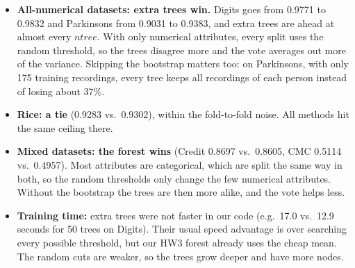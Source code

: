 \documentclass{article}
\begin{document}
\begin{itemize}
\item \textbf{All-numerical datasets: extra trees win.} Digits goes from 0.9771 to 0.9832 and Parkinsons from 0.9031
to 0.9383, and extra trees are ahead at almost every $ntree$. With only numerical attributes, every split uses the
random threshold, so the trees disagree more and the vote averages out more of the variance. Skipping the bootstrap
matters too: on Parkinsons, with only 175 training recordings, every tree keeps all recordings of each person instead
of losing about 37\%.
\item \textbf{Rice: a tie} (0.9283 vs.\ 0.9302), within the fold-to-fold noise. All methods hit the same ceiling there.
\item \textbf{Mixed datasets: the forest wins} (Credit 0.8697 vs.\ 0.8605, CMC 0.5114 vs.\ 0.4957). Most attributes are
categorical, which are split the same way in both, so the random thresholds only change the few numerical attributes.
Without the bootstrap the trees are then more alike, and the vote helps less.
\item \textbf{Training time:} extra trees were not faster in our code (e.g.\ 17.0 vs.\ 12.9 seconds for 50 trees on
Digits). Their usual speed advantage is over searching every possible threshold, but our HW3 forest already uses the
cheap mean. The random cuts are weaker, so the trees grow deeper and have more nodes.
\end{itemize}
\end{document}
